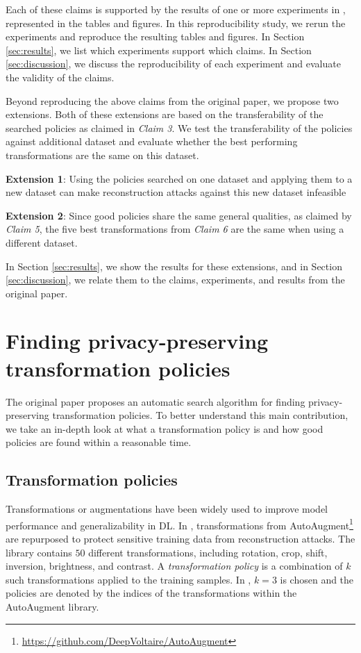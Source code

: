 Each of these claims is supported by the results of one or more experiments in \cite{gao2021privacy}, represented in the tables and figures. In this reproducibility study, we rerun the experiments and reproduce the resulting tables and figures. In Section \ref{sec:results}, we list which experiments support which claims. In Section \ref{sec:discussion}, we discuss the reproducibility of each experiment and evaluate the validity of the claims.

Beyond reproducing the above claims from the original paper, we propose two extensions. Both of these extensions are based on the transferability of the searched policies as claimed in \emph{Claim 3}. We test the transferability of the policies against additional dataset and evaluate whether the best performing transformations are the same on this dataset.

\textbf{Extension 1}: Using the policies searched on one dataset and applying them to a new dataset can make reconstruction attacks against this new dataset infeasible

\textbf{Extension 2}: Since good policies share the same general qualities, as claimed by \emph{Claim 5}, the five best transformations from \emph{Claim 6} are the same when using a different dataset.

In Section \ref{sec:results}, we show the results for these extensions, and in Section \ref{sec:discussion}, we relate them to the claims, experiments, and results from the original paper.



\section{Finding privacy-preserving transformation policies}

The original paper proposes an automatic search algorithm for finding privacy-preserving transformation policies. To better understand this main contribution, we take an in-depth look at what a transformation policy is and how good policies are found within a reasonable time.

\subsection{Transformation policies}

Transformations or augmentations have been widely used to improve model performance and generalizability in DL. In \cite{gao2021privacy}, transformations from AutoAugment\footnote{\url{https://github.com/DeepVoltaire/AutoAugment}} \cite{cubuk2019autoaugment} are repurposed to protect sensitive training data from reconstruction attacks. The library contains $50$ different transformations, including rotation, crop, shift, inversion, brightness, and contrast. A \emph{transformation policy} is a combination of $k$ such transformations applied to the training samples. In \cite{gao2021privacy}, $k=3$ is chosen and the policies are denoted by the indices of the transformations within the AutoAugment library.

